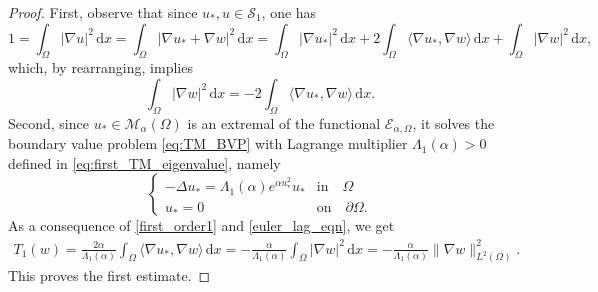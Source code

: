 \documentclass[reqno,11pt]{amsart}
\theoremstyle{definition}
\newcommand{\ud}{\,\mathrm{d}}
\begin{document}
\begin{proof}
\noindent First, observe
that since $u_*,u\in \mathcal{S}_1$, one has
\[1 = \int_\Omega |\nabla u|^2 \ud x = \int_\Omega |\nabla u_* + \nabla w|^2 \ud x =
\int_\Omega |\nabla u_*|^2 \ud x + 2 \int_\Omega \langle \nabla u_*, \nabla w \rangle
\ud x + \int_\Omega |\nabla w|^2 \ud x,\]
which, by rearranging, implies  
\begin{equation} \label{first_order1}  
\int_\Omega |\nabla w|^2 \ud x = -2 \int_\Omega \langle \nabla u_*, \nabla w
\rangle \ud x.
\end{equation} 
Second, since $u_*\in\mathcal{M}_\alpha(\Omega)$ is an extremal of the functional $\mathscr{E}_{\alpha,\Omega}$, it solves the 
boundary value problem \eqref{eq:TM_BVP} with Lagrange multiplier $\Lambda_1(\alpha)>0$ defined in \eqref{eq:first_TM_eigenvalue}, namely 
\begin{equation}\label{euler_lag_eqn}
		 \begin{cases}
			-\Delta u_*  = \Lambda_1(\alpha)  e^{\alpha u_{*}^2} u_* & \mbox{in} \quad \Omega\\
			u_*=0 & \mbox{on} \quad\partial \Omega.
		\end{cases} 
	\end{equation}
As a consequence of \eqref{first_order1} and 
\eqref{euler_lag_eqn}, we get
\begin{eqnarray} \label{first_order2} 
T_1(w) =  \frac{2\alpha}{\Lambda_1(\alpha)} \int_\Omega \langle \nabla u_*, \nabla w \rangle \ud x = -\frac{\alpha}{\Lambda_1(\alpha)} \int_\Omega |\nabla w|^2\ud x = -\frac{\alpha}{\Lambda_1(\alpha)} 
\| \nabla w \|_{L^2(\Omega)}^2. 
\end{eqnarray} 
This proves the first estimate.


\end{proof}
\end{document}
